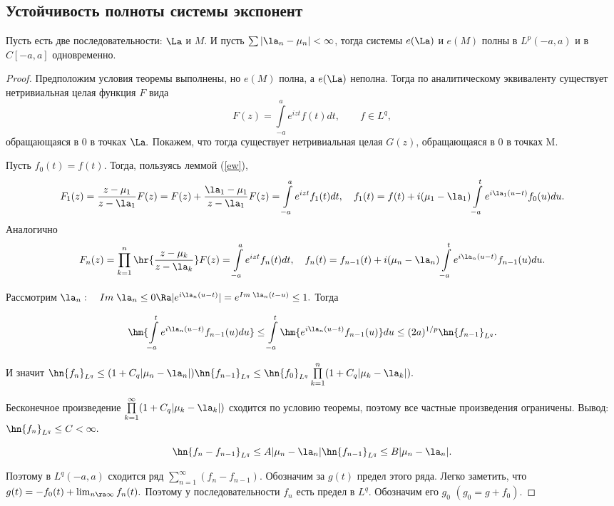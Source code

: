 \documentclass{article}
\begin{document}
\subsection{Устойчивость полноты системы экспонент}
\begin{theorem}
Пусть есть две последовательности: $\La$ и $M$. И пусть
$\sum|\la_n-\mu_n|<\infty$, тогда системы $e(\La)$ и
$e(M)$ полны в $L^p(-a,a)$ и в $C[-a,a]$ одновременно.
\end{theorem}
\begin{proof}
  Предположим условия теоремы выполнены, но
  $e(M)$ полна, а $e(\La)$ неполна. Тогда по аналитическому
  эквиваленту существует нетривиальная целая функция $F$ вида
  $$F(z)=\int\limits_{-a}^a e^{izt}f(t)dt,\qquad f\in L^q,$$
  обращающаяся в $0$ в точках $\La.$ Покажем, что тогда
  существует нетривиальная целая $G(z)$, обращающаяся в $0$ в точках
  M.

  Пусть $f_0(t)=f(t)$. Тогда, пользуясь леммой (\ref{ew}),
  \begin{equation*}
    F_1(z)=\frac{z-\mu_1}{z-\la_1}F(z)=F(z)+\frac{\la_1-\mu_1}{z-\la_1}F(z)=\int\limits_{-a}^ae^{izt}f_1(t)dt,\quad
    f_1(t)=f(t)+i(\mu_1-\la_1)\int\limits_{-a}^te^{i\la_1(u-t)}f_0(u)du.
  \end{equation*}
  Аналогично
  \begin{equation*}
    F_n(z)=\prod\limits_{k=1}^n\hr{\frac{z-\mu_k}{z-\la_k}}F(z)=\int\limits_{-a}^ae^{izt}f_n(t)dt,\quad
    f_n(t)=f_{n-1}(t)+i(\mu_n-\la_n)\int\limits_{-a}^te^{i\la_n(u-t)}f_{n-1}(u)du.
  \end{equation*}

  Рассмотрим $\la_n:\quad
  Im\;\la_n\le0\Ra|e^{i\la_n(u-t)}|=e^{Im\;\la_n(t-u)}\le1.$
  Тогда

  $$\hm{\int\limits_{-a}^te^{i\la_n(u-t)}f_{n-1}(u)du}\le\int\limits_{-a}^t\hm{e^{i\la_n(u-t)}f_{n-1}(u)}du\le(2a)^{1/p}\hn{f_{n-1}}_{L^q}.$$

  И значит
  $\hn{f_n}_{L^q}\le(1+C_q|\mu_n-\la_n|)\hn{f_{n-1}}_{L^q}\le\hn{f_0}_{L^q}\prod\limits_{k=1}^n(1+C_q|\mu_k-\la_k|).$

  Бесконечное произведение $\prod\limits_{k=1}^{\infty}(1+C_q|\mu_k-\la_k|)$ сходится по условию теоремы,
  поэтому все частные произведения ограничены. Вывод: $\hn{f_n}_{L^q}\le C<\infty.$

  $$\hn{f_n-f_{n-1}}_{L^q}\le
  A|\mu_n-\la_n| \hn{f_{n-1}}_{L^q}\le B|\mu_n-\la_n|.$$

  Поэтому в $L^q(-a,a)$ сходится ряд
  $\sum_{n=1}^{\infty}(f_n-f_{n-1})$. Обозначим за $g(t)$ предел
  этого ряда. Легко заметить, что
  $g(t)=-f_0(t)+\lim_{n\ra\infty}f_n(t).$ Поэтому у
  последовательности $f_n$ есть предел в $L^q$. Обозначим его $g_0$
  $(g_0=g+f_0).$


\end{proof}
\end{document}
